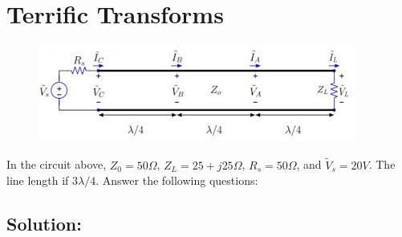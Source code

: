 \documentclass{article}
\begin{document}
\newpage

\section{Terrific Transforms}

\begin{figure}[H]
\begin{center}
    \includegraphics[width=0.93\textwidth]{figures/329 Problem 2.jpg}
\end{center}
\end{figure}

In the circuit above, $Z_0 = 50 \Omega$, $Z_L = 25 + j25 \Omega$, $R_s = 50 \Omega$, and $\tilde{V}_s = 20 V$. The line length if $3 \lambda / 4$. Answer the following questions:

\subsection{Solution:}
\end{document}
